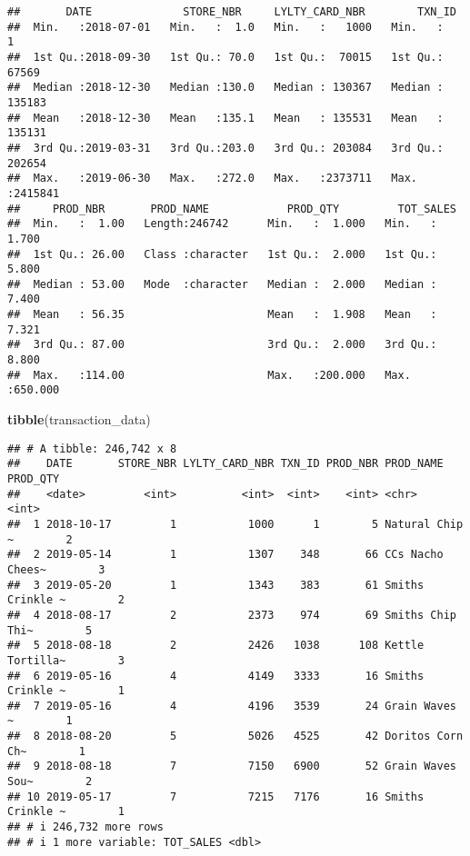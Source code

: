 \documentclass[
]{article}
\newenvironment{Shaded}{\begin{snugshade}}{\end{snugshade}}
\newcommand{\FunctionTok}[1]{\textcolor[rgb]{0.13,0.29,0.53}{\textbf{#1}}}
\newcommand{\NormalTok}[1]{#1}
\begin{document}
\begin{verbatim}
##       DATE              STORE_NBR     LYLTY_CARD_NBR        TXN_ID       
##  Min.   :2018-07-01   Min.   :  1.0   Min.   :   1000   Min.   :      1  
##  1st Qu.:2018-09-30   1st Qu.: 70.0   1st Qu.:  70015   1st Qu.:  67569  
##  Median :2018-12-30   Median :130.0   Median : 130367   Median : 135183  
##  Mean   :2018-12-30   Mean   :135.1   Mean   : 135531   Mean   : 135131  
##  3rd Qu.:2019-03-31   3rd Qu.:203.0   3rd Qu.: 203084   3rd Qu.: 202654  
##  Max.   :2019-06-30   Max.   :272.0   Max.   :2373711   Max.   :2415841  
##     PROD_NBR       PROD_NAME            PROD_QTY         TOT_SALES      
##  Min.   :  1.00   Length:246742      Min.   :  1.000   Min.   :  1.700  
##  1st Qu.: 26.00   Class :character   1st Qu.:  2.000   1st Qu.:  5.800  
##  Median : 53.00   Mode  :character   Median :  2.000   Median :  7.400  
##  Mean   : 56.35                      Mean   :  1.908   Mean   :  7.321  
##  3rd Qu.: 87.00                      3rd Qu.:  2.000   3rd Qu.:  8.800  
##  Max.   :114.00                      Max.   :200.000   Max.   :650.000
\end{verbatim}

\begin{Shaded}
\begin{Highlighting}[]
\FunctionTok{tibble}\NormalTok{(transaction\_data)}
\end{Highlighting}
\end{Shaded}

\begin{verbatim}
## # A tibble: 246,742 x 8
##    DATE       STORE_NBR LYLTY_CARD_NBR TXN_ID PROD_NBR PROD_NAME        PROD_QTY
##    <date>         <int>          <int>  <int>    <int> <chr>               <int>
##  1 2018-10-17         1           1000      1        5 Natural Chip   ~        2
##  2 2019-05-14         1           1307    348       66 CCs Nacho Chees~        3
##  3 2019-05-20         1           1343    383       61 Smiths Crinkle ~        2
##  4 2018-08-17         2           2373    974       69 Smiths Chip Thi~        5
##  5 2018-08-18         2           2426   1038      108 Kettle Tortilla~        3
##  6 2019-05-16         4           4149   3333       16 Smiths Crinkle ~        1
##  7 2019-05-16         4           4196   3539       24 Grain Waves    ~        1
##  8 2018-08-20         5           5026   4525       42 Doritos Corn Ch~        1
##  9 2018-08-18         7           7150   6900       52 Grain Waves Sou~        2
## 10 2019-05-17         7           7215   7176       16 Smiths Crinkle ~        1
## # i 246,732 more rows
## # i 1 more variable: TOT_SALES <dbl>
\end{verbatim}
\end{document}

